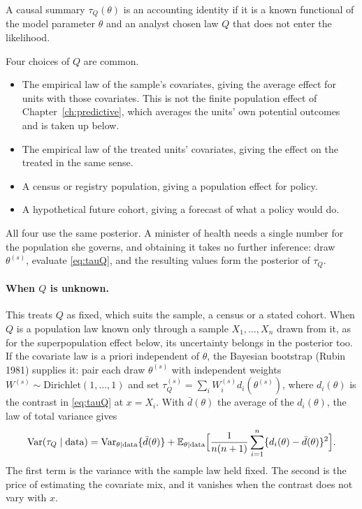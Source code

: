 \begin{definition}
A causal summary $\tau_Q(\theta)$ is an accounting identity if it is a known functional of the model parameter $\theta$ and an analyst chosen law $Q$ that does not enter the likelihood.
\end{definition}

Four choices of $Q$ are common.
\begin{itemize}
\item The empirical law of the sample's covariates, giving the average effect for units with those covariates. This is not the finite population effect of Chapter~\ref{ch:predictive}, which averages the units' own potential outcomes and is taken up below.
\item The empirical law of the treated units' covariates, giving the effect on the treated in the same sense.
\item A census or registry population, giving a population effect for policy.
\item A hypothetical future cohort, giving a forecast of what a policy would do.
\end{itemize}
All four use the same posterior. A minister of health needs a single number for the population she governs, and obtaining it takes no further inference: draw $\theta^{(s)}$, evaluate \eqref{eq:tauQ}, and the resulting values form the posterior of $\tau_Q$.

\paragraph{When $Q$ is unknown.} This treats $Q$ as fixed, which suits the sample, a census or a stated cohort. When $Q$ is a population law known only through a sample $X_1, \ldots, X_n$ drawn from it, as for the superpopulation effect below, its uncertainty belongs in the posterior too. If the covariate law is a priori independent of $\theta$, the Bayesian bootstrap (Rubin 1981) supplies it: pair each draw $\theta^{(s)}$ with independent weights $W^{(s)} \sim \mathrm{Dirichlet}(1, \ldots, 1)$ and set $\tau_Q^{(s)} = \sum_i W_i^{(s)} d_i(\theta^{(s)})$, where $d_i(\theta)$ is the contrast in \eqref{eq:tauQ} at $x = X_i$. With $\bar d(\theta)$ the average of the $d_i(\theta)$, the law of total variance gives
\[
\mathrm{Var}(\tau_Q \mid \text{data}) = \mathrm{Var}_{\theta \mid \text{data}}\{\bar d(\theta)\} + \mathbb{E}_{\theta \mid \text{data}}\Bigl[\frac{1}{n(n+1)} \sum_{i=1}^n \{d_i(\theta) - \bar d(\theta)\}^2\Bigr].
\]
The first term is the variance with the sample law held fixed. The second is the price of estimating the covariate mix, and it vanishes when the contrast does not vary with $x$.

